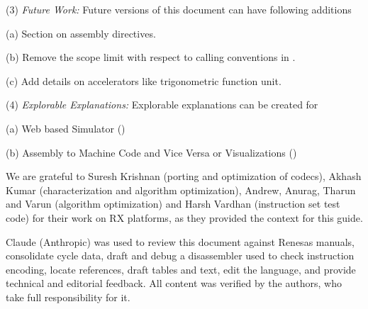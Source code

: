 \levelone
(3) \emph{Future Work:} %
Future versions of this document can have following additions

    \leveltwo
    (a) Section on assembly directives.

    (b) Remove the scope limit with respect to calling conventions in 
    .

    (c) Add details on accelerators like trigonometric function unit.

\levelone
(4) \emph{Explorable Explanations:} %
Explorable explanations can be created for

    \leveltwo
    (a) Web based Simulator (\cite{cpulator_rv32, jsspim, riscv_interactive_sim, riscv_web_sim, creator, arm_gmas})

    (b) Assembly to Machine Code and Vice Versa or Visualizations (\cite{rvcodecjs, armvis})



\SOPNoteBody

We are grateful to Suresh Krishnan (porting and optimization of codecs), Akhash Kumar (characterization and 
algorithm optimization), Andrew, Anurag, Tharun and Varun (algorithm optimization) and Harsh Vardhan 
(instruction set test code) for their work on RX platforms, as they provided the context for this guide.

Claude (Anthropic) was used to review this document against Renesas manuals, consolidate cycle data, 
draft and debug a disassembler used to check instruction encoding, locate references, draft tables 
and text, edit the language, and provide technical and editorial feedback. All content was verified 
by the authors, who take full responsibility for it.


